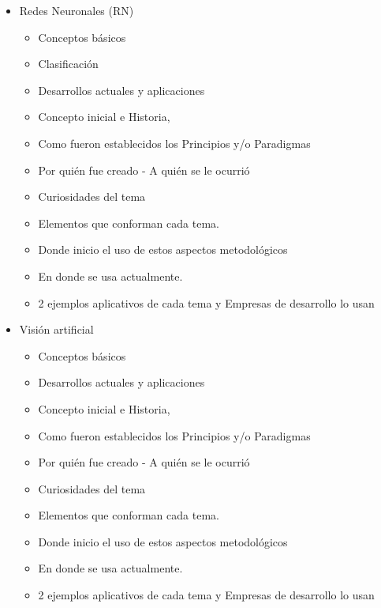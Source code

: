 \documentclass[12pt]{article}
\begin{document}
\begin{itemize}
    
    \item  Redes Neuronales (RN)
    		\begin{itemize}
			\item Conceptos básicos
			\item Clasificación
			\item Desarrollos actuales y aplicaciones
			\item Concepto inicial e Historia,
			\item Como fueron establecidos los Principios y/o Paradigmas
			\item Por quién fue creado - A quién se le ocurrió
			\item Curiosidades del tema
			\item Elementos que conforman cada tema.
			\item Donde inicio el uso de estos aspectos metodológicos
			\item En donde se usa actualmente.
			 \item 2 ejemplos aplicativos de cada tema y Empresas de desarrollo lo usan
		\end{itemize}
    
    \item Visión artificial
    		\begin{itemize}
			\item Conceptos básicos
			\item Desarrollos actuales y aplicaciones
			\item Concepto inicial e Historia,
			\item Como fueron establecidos los Principios y/o Paradigmas
			\item Por quién fue creado - A quién se le ocurrió
			\item Curiosidades del tema
			\item Elementos que conforman cada tema.
			\item Donde inicio el uso de estos aspectos metodológicos
			\item En donde se usa actualmente.
			 \item 2 ejemplos aplicativos de cada tema y Empresas de desarrollo lo usan
		\end{itemize}
    

\end{itemize}
\end{document}
